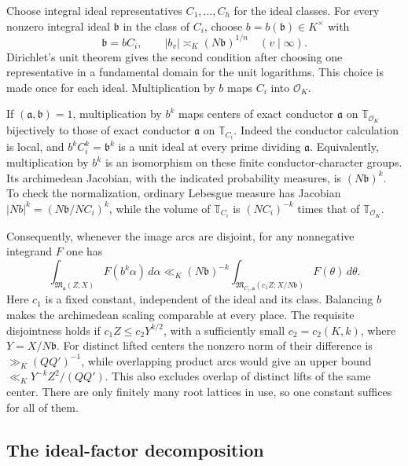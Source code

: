 \documentclass[11pt,reqno]{amsart}
\numberwithin{equation}{section}
\theoremstyle{definition}
\begin{document}
Choose integral ideal representatives $C_1,\ldots,C_h$ for the ideal
classes.  For every nonzero integral ideal $\mathfrak b$ in the class of
$C_i$, choose $b=b(\mathfrak b)\in K^\times$ with
\[
 \mathfrak b=b C_i,\qquad
 |b_v|\asymp_K(N\mathfrak b)^{1/n}\quad(v\mid\infty).
\]
Dirichlet's unit theorem gives the second condition after choosing one
representative in a fundamental domain for the unit logarithms.  This
choice is made once for each ideal.  Multiplication by $b$ maps $C_i$
into $\mathcal O_K$.

If $(\mathfrak a,\mathfrak b)=1$, multiplication by $b^k$ maps centers
of exact conductor $\mathfrak a$ on $\mathbb T_{\mathcal O_K}$ bijectively
to those of exact conductor $\mathfrak a$ on $\mathbb T_{C_i}$.
Indeed the conductor calculation is local, and
$b^kC_i^k=\mathfrak b^k$ is a unit ideal at every prime dividing
$\mathfrak a$.  Equivalently, multiplication by $b^k$ is an isomorphism
on these finite conductor-character groups.
Its archimedean Jacobian, with the indicated probability measures, is
$(N\mathfrak b)^k$.  To check the normalization, ordinary Lebesgue measure
has Jacobian $|Nb|^k=(N\mathfrak b/NC_i)^k$, while the volume of
$\mathbb T_{C_i}$ is $(NC_i)^{-k}$ times that of $\mathbb T_{\mathcal O_K}$.

Consequently, whenever the image arcs are disjoint, for any nonnegative
integrand $F$ one has
\begin{equation}\label{eq:field-arc-scaling}
 \int_{\mathfrak M_{\mathfrak a}(Z;X)}F(b^k\alpha)\,d\alpha
 \ll_K (N\mathfrak b)^{-k}
 \int_{\mathfrak M_{C_i,\mathfrak a}(c_1Z;X/N\mathfrak b)}
                         F(\theta)\,d\theta .
\end{equation}
Here $c_1$ is a fixed constant, independent of the ideal and its class.
Balancing $b$ makes the archimedean scaling comparable at every place.
The requisite disjointness holds if
$c_1Z\le c_2Y^{k/2}$, with a sufficiently small $c_2=c_2(K,k)$,
where $Y=X/N\mathfrak b$.
For distinct lifted centers the nonzero norm of their difference is
$\gg_K(QQ')^{-1}$, while overlapping product arcs would give an upper
bound $\ll_KY^{-k}Z^2/(QQ')$.  This also excludes overlap of distinct
lifts of the same center.  There are only finitely many root lattices
in use, so one constant suffices for all of them.

\subsection{The ideal-factor decomposition}
\end{document}
